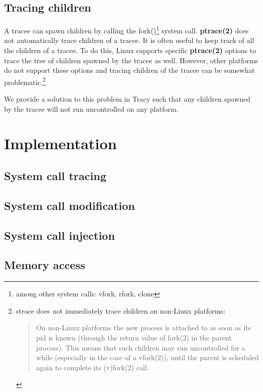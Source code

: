 \documentclass[a4paper, twoside, 10pt, twocolumn]{report}
\begin{document}
\section{Tracing children}

A tracee can spawn children by calling the fork()\footnote{among other system
calls: vfork, rfork, clone} system call. \textbf{ptrace(2)} does not
automatically trace children of a tracee. It is often useful to keep track of
all the children of a tracee. To do this, Linux supports specific
\textbf{ptrace(2)} options to trace the tree of children spawned by the tracee
as well. However, other platforms do not support these options and tracing
children of the tracee can be somewhat problematic.\footnote{strace does not
immediately trace children on non-Linux platforms:
\begin{quote}
    On non-Linux platforms the new process is attached to as soon as its pid is
    known (through the return value of fork(2) in the parent process).
    This means that such children may run uncontrolled for a while
    (especially in the case of a vfork(2)), until the parent is scheduled
    again to complete its (v)fork(2)  call.
\end{quote}
}

We provide a solution to this problem in Tracy such that any children spawned
by the tracee will not run uncontrolled on any platform.

\chapter{Implementation}

\section{System call tracing}


\section{System call modification}

\section{System call injection}

\section{Memory access}
\end{document}

